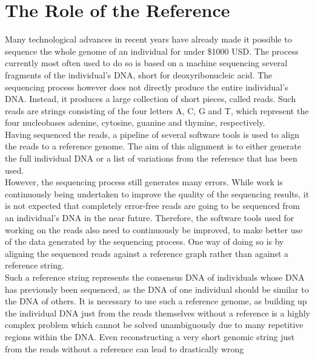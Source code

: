 \documentclass[a4paper,12pt,twoside,BCOR=10mm]{scrbook}
\begin{document}
\section{The Role of the Reference}

Many technological advances in recent years have already made it possible to sequence the whole genome
of an individual for under \$1000 USD.
The process currently most often used to do so
is based on a machine sequencing several fragments of the
individual's DNA, short for deoxyribonucleic acid.
The sequencing process however does not directly produce the entire individual's DNA.
Instead, it produces a large collection of short pieces, called reads.
Such reads are strings consisting of the four letters A, C, G and T,
which represent the four nucleobases adenine, cytosine, guanine and thymine, respectively. \\
Having sequenced the reads,
a pipeline of several software tools is used to align the reads to a reference genome.
The aim of this alignment is to either generate the full individual DNA or a list of variations
from the reference that has been used. \\
However, the sequencing process still generates many errors.
While work is continuously being undertaken
to improve the quality of the sequencing results,
it is not expected that completely error-free reads
are going to be sequenced from an individual's DNA in the near future.
Therefore, the software tools used for working on the reads also need to continuously be improved,
to make better use of the data generated by the sequencing process.
One way of doing so is by aligning the sequenced reads against a reference graph rather than against a reference string. \\
Such a reference string
represents the consensus DNA of individuals whose DNA has previously been sequenced,
as the DNA of one individual should be similar to the DNA of others.
It is necessary to use such a reference genome, as
building up the individual DNA just from the reads themselves without a reference is a highly complex problem
which cannot be solved unambiguously due to many repetitive regions within the DNA.
Even reconstructing a very short genomic string just from the reads without a reference can lead to drastically wrong
\end{document}
